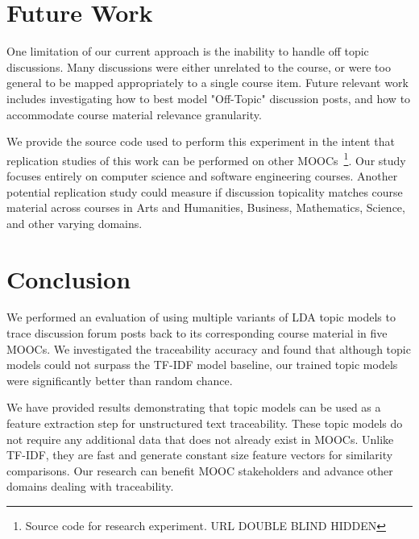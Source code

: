 \documentclass[sigconf, nonacm=true]{acmart}
\begin{document}
\section{Future Work}
One limitation of our current approach is the inability to handle off topic discussions.
Many discussions were either unrelated to the course, or were too general to be mapped appropriately to a single course item.
Future relevant work includes investigating how to best model "Off-Topic" discussion posts, and how to accommodate course material relevance granularity.

We provide the source code used to perform this experiment in the intent that replication studies of this work can be performed on other MOOCs~\footnote{Source code for research experiment.
    URL DOUBLE BLIND HIDDEN}.
Our study focuses entirely on computer science and software engineering courses.
Another potential replication study could measure if discussion topicality matches course material across courses in Arts and Humanities, Business, Mathematics, Science, and other varying domains.

\section{Conclusion}
We performed an evaluation of using multiple variants of LDA topic models to trace discussion forum posts back to its corresponding course material in five MOOCs.
We investigated the traceability accuracy and found that although topic models could not surpass the TF-IDF model baseline, our trained topic models were significantly better than random chance.

We have provided results demonstrating that topic models can be used as a feature extraction step for unstructured text traceability.
These topic models do not require any additional data that does not already exist in MOOCs.
Unlike TF-IDF, they are fast and generate constant size feature vectors for similarity comparisons.
Our research can benefit MOOC stakeholders and advance other domains dealing with traceability.



\end{document}
